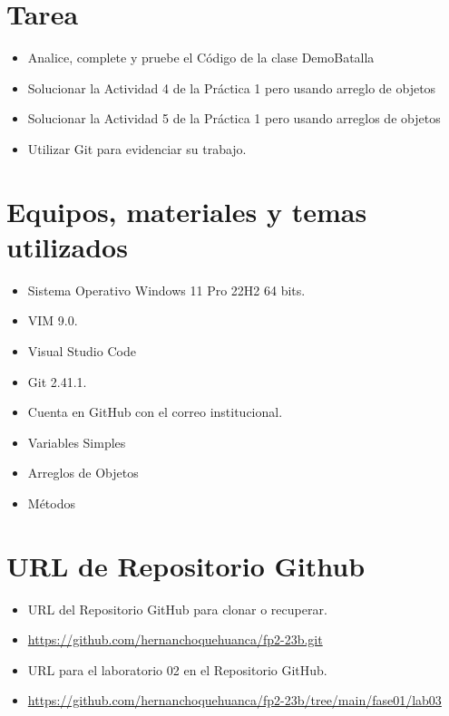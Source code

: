 \documentclass{article}
\begin{document}

	\section{Tarea}
	\begin{itemize}		
		\item Analice, complete y pruebe el Código de la clase DemoBatalla 
        \item Solucionar la Actividad 4 de la Práctica 1 pero usando arreglo de objetos
        \item Solucionar la Actividad 5 de la Práctica 1 pero usando arreglos de objetos
        
		\item Utilizar Git para evidenciar su trabajo.

	\end{itemize}
		
	\section{Equipos, materiales y temas utilizados}
	\begin{itemize}
		\item Sistema Operativo Windows 11 Pro 22H2 64 bits.
		\item VIM 9.0.
		\item Visual Studio Code
		\item Git 2.41.1.
		\item Cuenta en GitHub con el correo institucional.
            \item Variables Simples
		\item Arreglos de Objetos
        \item Métodos
	\end{itemize}
	
	\section{URL de Repositorio Github}
	\begin{itemize}
		\item URL del Repositorio GitHub para clonar o recuperar.
        \item \url{https://github.com/hernanchoquehuanca/fp2-23b.git}
		\item URL para el laboratorio 02 en el Repositorio GitHub.
		\item \url{https://github.com/hernanchoquehuanca/fp2-23b/tree/main/fase01/lab03}
	\end{itemize}
	
\end{document}
